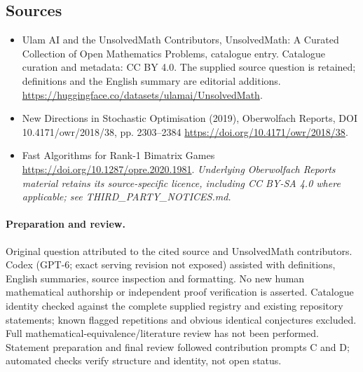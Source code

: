 \documentclass[11pt]{article}
\begin{document}
\subsection{Sources}
\begin{itemize}
\item[\hypertarget{source:statement:1}{S1}] Ulam AI and the UnsolvedMath Contributors, UnsolvedMath: A Curated Collection of Open Mathematics Problems, catalogue entry. Catalogue curation and metadata: CC BY 4.0. The supplied source question is retained; definitions and the English summary are editorial additions.
\url{https://huggingface.co/datasets/ulamai/UnsolvedMath}.
\item[\hypertarget{source:statement:2}{S2}] New Directions in Stochastic Optimisation (2019), Oberwolfach Reports, DOI 10.4171/owr/2018/38, pp. 2303--2384
\url{https://doi.org/10.4171/owr/2018/38}.
\item[\hypertarget{source:statement:3}{S3}] Fast Algorithms for Rank-1 Bimatrix Games
\url{https://doi.org/10.1287/opre.2020.1981}.
\textit{Underlying Oberwolfach Reports material retains its source-specific licence, including CC BY-SA 4.0 where applicable; see THIRD\_PARTY\_NOTICES.md.}
\end{itemize}
\paragraph{Preparation and review.}
Original question attributed to the cited source and UnsolvedMath contributors. Codex (GPT-6; exact serving revision not exposed) assisted with definitions, English summaries, source inspection and formatting. No new human mathematical authorship or independent proof verification is asserted. Catalogue identity checked against the complete supplied registry and existing repository statements; known flagged repetitions and obvious identical conjectures excluded. Full mathematical-equivalence/literature review has not been performed. Statement preparation and final review followed contribution prompts C and D; automated checks verify structure and identity, not open status.
\label{end:statement}
\end{document}
